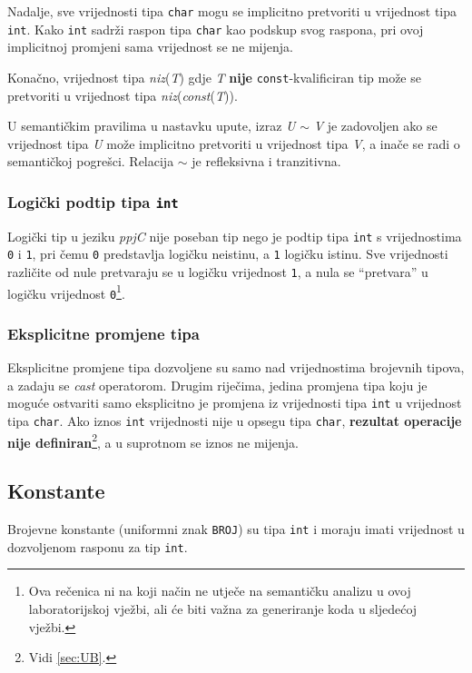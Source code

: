 \documentclass[times, 12pt, utf8]{book}
\begin{document}
Nadalje, sve vrijednosti tipa \verb|char| mogu se implicitno pretvoriti u vrijednost tipa \verb|int|.
Kako \verb|int| sadrži raspon tipa \verb|char| kao podskup svog raspona, pri ovoj implicitnoj promjeni sama vrijednost se ne mijenja.

Konačno, vrijednost tipa \emph{niz}(\emph{T}) gdje \emph{T} \textbf{nije} \verb|const|-kvalificiran tip može se pretvoriti u vrijednost tipa \emph{niz}(\emph{const}(\emph{T})).

U semantičkim pravilima u nastavku upute, izraz \emph{U} \(\sim\) \emph{V} je zadovoljen ako se vrijednost tipa \emph{U} može implicitno pretvoriti u vrijednost tipa \emph{V}, a inače se radi o semantičkoj pogrešci.
Relacija \(\sim\) je refleksivna i tranzitivna.

\subsubsection{Logički podtip tipa \texttt{int}}
Logički tip u jeziku \emph{ppjC} nije poseban tip nego je podtip tipa \verb|int| s vrijednostima \verb|0| i \verb|1|, pri čemu \verb|0| predstavlja logičku neistinu, a \verb|1| logičku istinu.
Sve vrijednosti različite od nule pretvaraju se u logičku vrijednost \verb|1|, a nula se ``pretvara'' u logičku vrijednost \verb|0|\footnote{Ova rečenica ni na koji način ne utječe na semantičku analizu u ovoj laboratorijskoj vježbi, ali će biti važna za generiranje koda u sljedećoj vježbi.}.

\subsubsection{Eksplicitne promjene tipa}\label{sec:semantika_cast}
Eksplicitne promjene tipa dozvoljene su samo nad vrijednostima brojevnih tipova, a zadaju se \emph{cast} operatorom.
Drugim riječima, jedina promjena tipa koju je moguće ostvariti samo eksplicitno je promjena iz vrijednosti tipa \verb|int| u vrijednost tipa \verb|char|.
Ako iznos \verb|int| vrijednosti nije u opsegu tipa \verb|char|, \textbf{rezultat operacije nije definiran}\footnote{Vidi \ref{sec:UB}.}, a u suprotnom se iznos ne mijenja.

\subsection{Konstante}\label{sec:semantika_konstante}
Brojevne konstante (uniformni znak \verb|BROJ|) su tipa \verb|int| i moraju imati vrijednost u dozvoljenom rasponu za tip \verb|int|.
\end{document}
